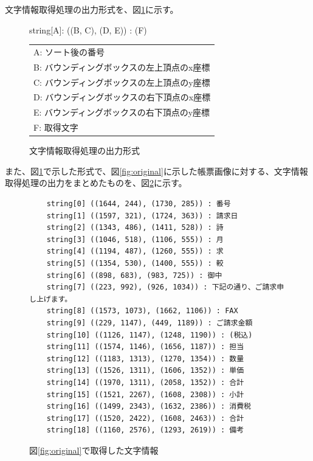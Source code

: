 文字情報取得処理の出力形式を、図\ref{fig:format_char}に示す。
\begin{figure}[tp]
    \begin{center}
        string[A]: ((B, C), (D, E)) : (F)
    \end{center}

    \begin{center}
        \begin{tabular}{l}
        A: ソート後の番号\\  
        B: バウンディングボックスの左上頂点のx座標\\
        C: バウンディングボックスの左上頂点のy座標\\  
        D: バウンディングボックスの右下頂点のx座標\\
        E: バウンディングボックスの右下頂点のy座標\\
        F: 取得文字\\
        \end{tabular}
    \end{center}
    \caption{文字情報取得処理の出力形式}
    \label{fig:format_char}
\end{figure}
また、図\ref{fig:format_char}で示した形式で、図\ref{fig:original}に示した帳票画像に対する、文字情報取得処理の出力をまとめたものを、図\ref{fig:char_recognition_for_original}に示す。
\lstset{language=}
\begin{figure}[tp]
    \begin{lstlisting}
    string[0] ((1644, 244), (1730, 285)) : 番号
    string[1] ((1597, 321), (1724, 363)) : 請求日
    string[2] ((1343, 486), (1411, 528)) : 詩
    string[3] ((1046, 518), (1106, 555)) : 月
    string[4] ((1194, 487), (1260, 555)) : 求
    string[5] ((1354, 530), (1400, 555)) : 較
    string[6] ((898, 683), (983, 725)) : 御中
    string[7] ((223, 992), (926, 1034)) : 下記の通り、ご請求申し上げます。
    string[8] ((1573, 1073), (1662, 1106)) : FAX
    string[9] ((229, 1147), (449, 1189)) : ご請求金額
    string[10] ((1126, 1147), (1248, 1190)) : (税込)
    string[11] ((1574, 1146), (1656, 1187)) : 担当
    string[12] ((1183, 1313), (1270, 1354)) : 数量
    string[13] ((1526, 1311), (1606, 1352)) : 単価
    string[14] ((1970, 1311), (2058, 1352)) : 合計
    string[15] ((1521, 2267), (1608, 2308)) : 小計
    string[16] ((1499, 2343), (1632, 2386)) : 消費税
    string[17] ((1520, 2422), (1608, 2463)) : 合計
    string[18] ((1160, 2576), (1293, 2619)) : 備考
    \end{lstlisting}
    \caption{図\ref{fig:original}で取得した文字情報}
    \label{fig:char_recognition_for_original}
\end{figure}

